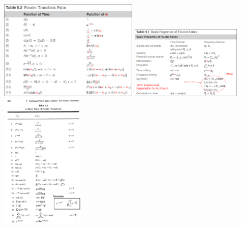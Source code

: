 \documentclass[12pt,landscape,letterpaper]{article}
\begin{document}
\begin{multicols*}{2}
	\includegraphics[width=0.5\textwidth]{fourierXform-pairs}
	\includegraphics[width=0.4\textwidth]{fourierSeries-props}
	\includegraphics[width=0.3\textwidth]{fourierXform-pairs2}
\end{multicols*}

\newpage
\end{document}
